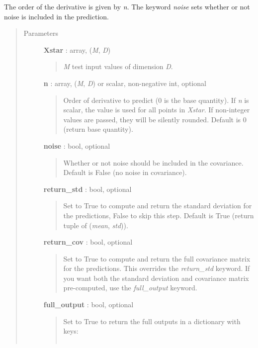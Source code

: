 \documentclass[letterpaper,10pt,english]{sphinxmanual}
\begin{document}
\begin{fulllineitems}
\begin{fulllineitems}
The order of the derivative is given by \emph{n}. The keyword \emph{noise} sets
whether or not noise is included in the prediction.
\begin{quote}\begin{description}
\item[{Parameters}] \leavevmode
\textbf{Xstar} : array, (\emph{M}, \emph{D})
\begin{quote}

\emph{M} test input values of dimension \emph{D}.
\end{quote}

\textbf{n} : array, (\emph{M}, \emph{D}) or scalar, non-negative int, optional
\begin{quote}

Order of derivative to predict (0 is the base quantity). If \emph{n} is
scalar, the value is used for all points in \emph{Xstar}. If non-integer
values are passed, they will be silently rounded. Default is 0
(return base quantity).
\end{quote}

\textbf{noise} : bool, optional
\begin{quote}

Whether or not noise should be included in the covariance. Default
is False (no noise in covariance).
\end{quote}

\textbf{return\_std} : bool, optional
\begin{quote}

Set to True to compute and return the standard deviation for the
predictions, False to skip this step. Default is True (return tuple
of (\emph{mean}, \emph{std})).
\end{quote}

\textbf{return\_cov} : bool, optional
\begin{quote}

Set to True to compute and return the full covariance matrix for the
predictions. This overrides the \emph{return\_std} keyword. If you want
both the standard deviation and covariance matrix pre-computed, use
the \emph{full\_output} keyword.
\end{quote}

\textbf{full\_output} : bool, optional
\begin{quote}

Set to True to return the full outputs in a dictionary with keys:
\begin{quote}

\begin{tabulary}{\linewidth}{|L|L|}
\hline


\end{tabulary}
\end{quote}
\end{quote}
\end{description}
\end{quote}
\end{fulllineitems}
\end{fulllineitems}
\end{document}
